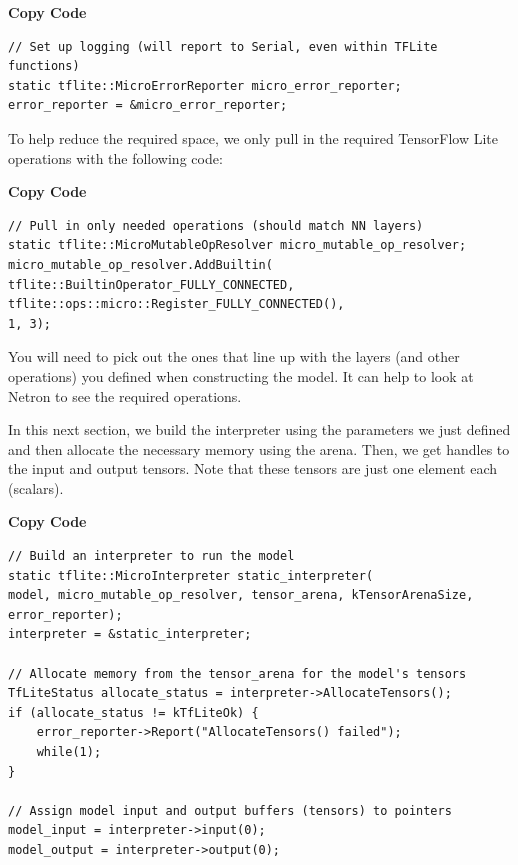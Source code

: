 \medskip

\textbf{Copy Code}

\begin{lstlisting}
// Set up logging (will report to Serial, even within TFLite functions)
static tflite::MicroErrorReporter micro_error_reporter;
error_reporter = &micro_error_reporter;
\end{lstlisting}



To help reduce the required space, we only pull in the required TensorFlow Lite operations with the following code:



\medskip 

\textbf{Copy Code}


\begin{lstlisting}
// Pull in only needed operations (should match NN layers)
static tflite::MicroMutableOpResolver micro_mutable_op_resolver;
micro_mutable_op_resolver.AddBuiltin(
tflite::BuiltinOperator_FULLY_CONNECTED,
tflite::ops::micro::Register_FULLY_CONNECTED(),
1, 3);
\end{lstlisting}




You will need to pick out the ones that line up with the layers (and other operations) you defined when constructing the model. It can help to look at Netron to see the required operations.

In this next section, we build the interpreter using the parameters we just defined and then allocate the necessary memory using the arena. Then, we get handles to the input and output tensors. Note that these tensors are just one element each (scalars).



\medskip

\textbf{Copy Code}

\begin{lstlisting}
// Build an interpreter to run the model
static tflite::MicroInterpreter static_interpreter(
model, micro_mutable_op_resolver, tensor_arena, kTensorArenaSize,
error_reporter);
interpreter = &static_interpreter;

// Allocate memory from the tensor_arena for the model's tensors
TfLiteStatus allocate_status = interpreter->AllocateTensors();
if (allocate_status != kTfLiteOk) {
    error_reporter->Report("AllocateTensors() failed");
    while(1);
}

// Assign model input and output buffers (tensors) to pointers
model_input = interpreter->input(0);
model_output = interpreter->output(0);
\end{lstlisting}



